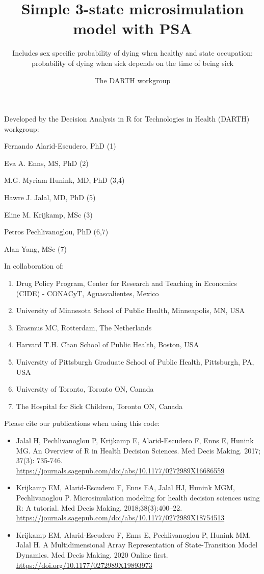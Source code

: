 \documentclass[
]{article}
\title{Simple 3-state microsimulation model with PSA}
\subtitle{Includes sex specific probability of dying when healthy and state
occupation: probability of dying when sick depends on the time of being
sick}
\author{The DARTH workgroup}
\date{}
\providecommand{\tightlist}{%
  \setlength{\itemsep}{0pt}\setlength{\parskip}{0pt}}
\begin{document}
\maketitle

Developed by the Decision Analysis in R for Technologies in Health
(DARTH) workgroup:

Fernando Alarid-Escudero, PhD (1)

Eva A. Enns, MS, PhD (2)

M.G. Myriam Hunink, MD, PhD (3,4)

Hawre J. Jalal, MD, PhD (5)

Eline M. Krijkamp, MSc (3)

Petros Pechlivanoglou, PhD (6,7)

Alan Yang, MSc (7)

In collaboration of:

\begin{enumerate}
\def\labelenumi{\arabic{enumi}.}
\tightlist
\item
  Drug Policy Program, Center for Research and Teaching in Economics
  (CIDE) - CONACyT, Aguascalientes, Mexico
\item
  University of Minnesota School of Public Health, Minneapolis, MN, USA
\item
  Erasmus MC, Rotterdam, The Netherlands
\item
  Harvard T.H. Chan School of Public Health, Boston, USA
\item
  University of Pittsburgh Graduate School of Public Health, Pittsburgh,
  PA, USA
\item
  University of Toronto, Toronto ON, Canada
\item
  The Hospital for Sick Children, Toronto ON, Canada
\end{enumerate}

Please cite our publications when using this code:

\begin{itemize}
\item
  Jalal H, Pechlivanoglou P, Krijkamp E, Alarid-Escudero F, Enns E,
  Hunink MG. An Overview of R in Health Decision Sciences. Med Decis
  Making. 2017; 37(3): 735-746.
  \url{https://journals.sagepub.com/doi/abs/10.1177/0272989X16686559}
\item
  Krijkamp EM, Alarid-Escudero F, Enns EA, Jalal HJ, Hunink MGM,
  Pechlivanoglou P. Microsimulation modeling for health decision
  sciences using R: A tutorial. Med Decis Making. 2018;38(3):400--22.
  \url{https://journals.sagepub.com/doi/abs/10.1177/0272989X18754513}
\item
  Krijkamp EM, Alarid-Escudero F, Enns E, Pechlivanoglou P, Hunink MM,
  Jalal H. A Multidimensional Array Representation of State-Transition
  Model Dynamics. Med Decis Making. 2020 Online first.
  \url{https://doi.org/10.1177/0272989X19893973}
\end{itemize}
\end{document}

